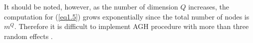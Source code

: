 	It should be noted, however, as the number of dimension $Q$ increases, the computation for (\ref{eq1.5}) grows exponentially since the total number of nodes is $m^Q$.  Therefore it is difficult to implement AGH procedure with more than three random effects \citep{bolker2009generalized}.
	
